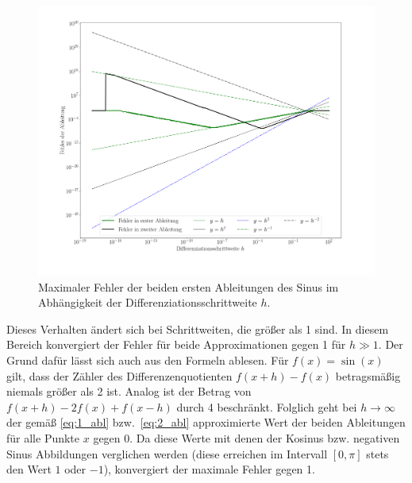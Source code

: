 \documentclass[smallheadings]{scrartcl}
\begin{document}
\begin{figure}[H]
	\includegraphics[width=\linewidth]{Bilder/errplot_lang}
	\caption{Maximaler Fehler der beiden ersten Ableitungen des Sinus im Abhängigkeit der Differenziationsschrittweite $h$.}
	\label{im:ablplot}
\end{figure}

Dieses Verhalten ändert sich bei Schrittweiten, die größer als 1 sind. In diesem Bereich konvergiert der Fehler für beide Approximationen gegen 1 für $h\gg1$. Der Grund dafür lässt sich auch aus den Formeln ablesen. Für $f(x)=\sin(x)$ gilt, dass der Zähler des Differenzenquotienten $f(x+h)-f(x)$ betragsmäßig niemals größer als 2 ist. Analog ist der Betrag von $f(x+h)-2f(x)+f(x-h)$ durch 4 beschränkt. Folglich geht bei $h\rightarrow\infty$ der gemäß \eqref{eq:1_abl} bzw.~\eqref{eq:2_abl} approximierte Wert der beiden Ableitungen für alle Punkte $x$ gegen 0. Da diese Werte mit denen der Kosinus bzw. negativen Sinus Abbildungen verglichen werden (diese erreichen im Intervall $\left[0,\pi\right]$ stets den Wert $1$ oder $-1$), konvergiert der maximale Fehler gegen 1. 
\end{document}
